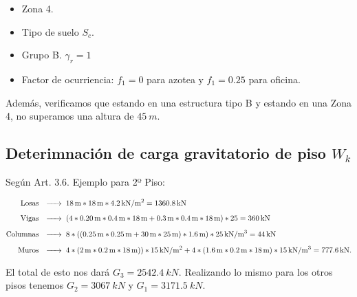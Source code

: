 \documentclass[../main.tex]{subfiles}
\begin{document}
\begin{itemize}
  \item Zona 4.
  \item Tipo de suelo \textbf{$S_c$}.
  \item Grupo B. $\gamma_r = 1$
  \item Factor de ocurriencia: $f_1=0$ para azotea y  $f_1=0.25$ para oficina.
\end{itemize}

Además, verificamos que estando en una estructura tipo B y estando en una Zona 4,
no superamos una altura de $\SI{45}{m}$. 


\subsection{Deterimnación de carga gravitatorio de piso $W_k$}

Según Art. 3.6. Ejemplo para 2º Piso:

\begin{align*}
  \text{Losas} \hspace{0.25cm} &\xrightarrow{\hspace*{0.5cm}} \hspace{0.1cm} 
    \SI{18}{m} * \SI{18}{m} * \SI{4.2}{kN /m^2} = \SI{1360.8}{kN} \\[5pt] 
  \text{Vigas} \hspace{0.25cm} &\xrightarrow{\hspace*{0.5cm}} \hspace{0.1cm} (4 * 
    \SI{0.20}{m} * \SI{0.4}{m} * \SI{18}{m} + \SI{0.3}{m}*\SI{0.4}{m}*\SI{18}{m}) * 25 
    = \SI{360}{kN} \\[5pt]
  \text{Columnas} \hspace{0.25cm} &\xrightarrow{\hspace*{0.5cm}} \hspace{0.1cm}
    8*((\SI{0.25}{m}*\SI{0.25}{m}+\SI{30}{m}*\SI{25}{m})*\SI{1.6}{m})*\SI{25}{kN /m^3} 
    = \SI{44}{kN} \\[5pt]
  \text{Muros} \hspace{0.25cm} &\xrightarrow{\hspace*{0.5cm}} \hspace{0.1cm}
    4*(\SI{2}{m}*\SI{0.2}{m}*\SI{18}{m}))*\SI{15}{kN /m^2} + 4 * (\SI{1.6}{m} * 
    \SI{0.2}{m} * \SI{18}{m})*\SI{15}{kN /m^3} = \SI{777.6}{kN}
.\end{align*}

El total de esto nos dará $G_3=\SI{2542.4}{kN}$. Realizando lo mismo para los otros
pisos tenemos $G_2 = \SI{3067}{kN}$ y $G_1 = \SI{3171.5}{kN}$.
\end{document}

